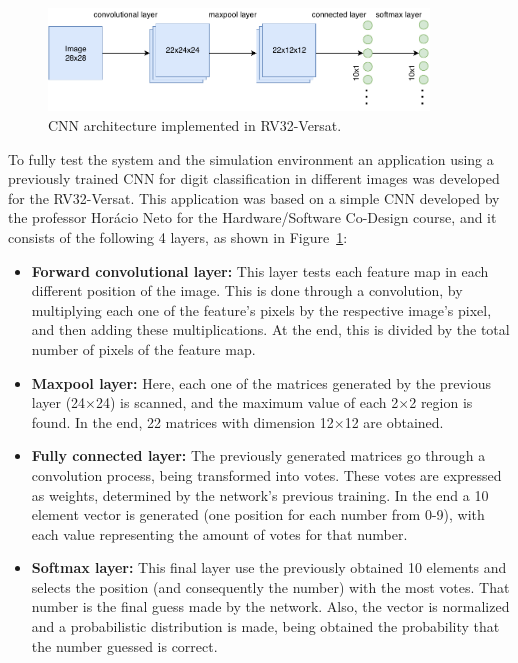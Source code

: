 \begin{figure}[!htb]
	\centering
	\includegraphics[width=0.9\textwidth]{Figures/CNN_architecture.pdf}
	\caption{CNN architecture implemented in RV32-Versat.}
	\label{fig:cnn}
\end{figure}

To fully test the system and the simulation environment an application using a previously
trained \ac{CNN} for digit classification in different images
was developed for the RV32-Versat. This application was based on a simple \ac{CNN} 
developed by the professor Horácio Neto for the Hardware/Software Co-Design course, and 
it consists of the following 4 layers, as shown in Figure~\ref{fig:cnn}:

\begin{itemize}
	\item \textbf{Forward convolutional layer:} This layer tests each feature map in each
	different position of the image. This is done through a convolution, by multiplying 
	each
	one of the feature's pixels by the respective image's pixel, and then adding these
	multiplications. At the end, this is divided by the total number of pixels of the 
	feature map.
	\item \textbf{Maxpool layer:} Here, each one of the matrices generated by the previous
	layer (24$\times$24) is scanned, and the maximum value of each 2$\times$2 region is 
	found. In the end, 22 matrices with dimension 12$\times$12 are obtained.
	\item \textbf{Fully connected layer:} The previously generated matrices go through a
	convolution process, being transformed into votes. These votes are expressed as 
	weights, determined by the network's previous training. In the end a 10 element 
	vector is generated	(one position for each number from 0-9), with each value 
	representing the amount of votes for that number.
	\item \textbf{Softmax layer:} This final layer use the previously obtained 10 elements
	and selects the position (and consequently the number) with the most votes. That 
	number is the final guess made by the network. Also, the vector is normalized and a 
	probabilistic distribution is made, being obtained the probability that the number 
	guessed is correct.
\end{itemize}

